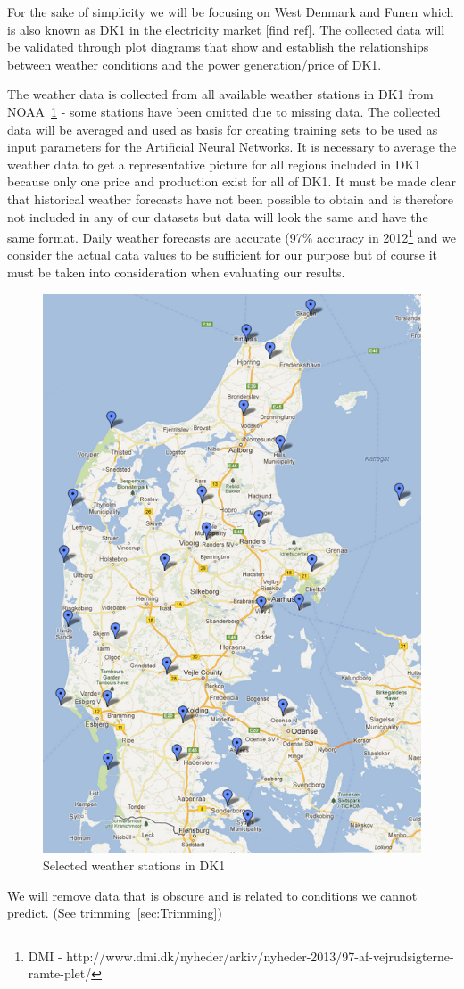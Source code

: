 For the sake of simplicity we will be focusing on West Denmark and Funen which is also known as DK1 in the electricity market [find ref]. The collected data will be validated through plot diagrams that show and establish the relationships between weather conditions and the power generation/price of DK1.

The weather data is collected from all available weather stations in DK1 from NOAA~\ref{fig:stations4average} - some stations have been omitted due to missing data. The collected data will be averaged and used as basis for creating training sets to be used as input parameters for the Artificial Neural Networks. It is necessary to average the weather data to get a representative picture for all regions included in DK1 because only one price and production exist for all of DK1. It must be made clear that historical weather forecasts have not been possible to obtain and is therefore not included in any of our datasets but data will look the same and have the same format. Daily weather forecasts are accurate (97\% accuracy in 2012\footnote{DMI - http://www.dmi.dk/nyheder/arkiv/nyheder-2013/97-af-vejrudsigterne-ramte-plet/} and we consider the actual data values to be sufficient for our purpose but of course it must be taken into consideration when evaluating our results.

\begin{figure}[H]
\centering
\includegraphics[width=0.85\linewidth,natwidth=898,natheight=587]{billeder/stations4average.png}
\caption{Selected weather stations in DK1}
\label{fig:stations4average}
\end{figure}


We will remove data that is obscure and is related to conditions we cannot predict. (See trimming~\ref{sec:Trimming})